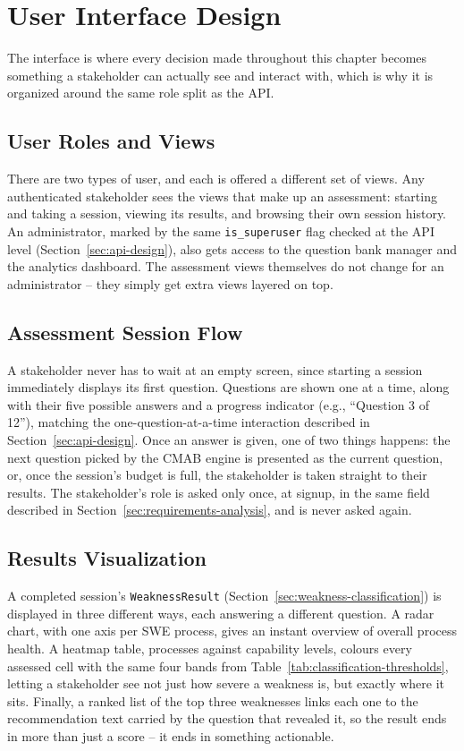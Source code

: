 \documentclass[a4paper, 12pt, oneside, openany, BCOR1cm,toc=chapterentrywithdots]{scrbook}
\begin{document}
\section{User Interface Design}
\label{sec:user-interface-design}

The interface is where every decision made throughout this chapter becomes something a
stakeholder can actually see and interact with, which is why it is organized around the same
role split as the API.

\subsection{User Roles and Views}

There are two types of user, and each is offered a different set of views. Any authenticated
stakeholder sees the views that make up an assessment: starting and taking a session, viewing its
results, and browsing their own session history. An administrator, marked by the same
\texttt{is\_superuser} flag checked at the API level (Section~\ref{sec:api-design}), also gets
access to the question bank manager and the analytics dashboard. The assessment views themselves
do not change for an administrator -- they simply get extra views layered on top.

\subsection{Assessment Session Flow}

A stakeholder never has to wait at an empty screen, since starting a session immediately displays
its first question. Questions are shown one at a time, along with their five possible answers and
a progress indicator (e.g., ``Question 3 of 12''), matching the one-question-at-a-time
interaction described in Section~\ref{sec:api-design}. Once an answer is given, one of two things
happens: the next question picked by the CMAB engine is presented as the current question, or,
once the session's budget is full, the stakeholder is taken straight to their results. The
stakeholder's role is asked only once, at signup, in the same field described in
Section~\ref{sec:requirements-analysis}, and is never asked again.

\subsection{Results Visualization}

A completed session's \texttt{WeaknessResult} (Section~\ref{sec:weakness-classification}) is
displayed in three different ways, each answering a different question. A radar chart, with one
axis per SWE process, gives an instant overview of overall process health. A heatmap table,
processes against capability levels, colours every assessed cell with the same four bands from
Table~\ref{tab:classification-thresholds}, letting a stakeholder see not just how severe a
weakness is, but exactly where it sits. Finally, a ranked list of the top three weaknesses links
each one to the recommendation text carried by the question that revealed it, so the result ends
in more than just a score -- it ends in something actionable.
\end{document}

